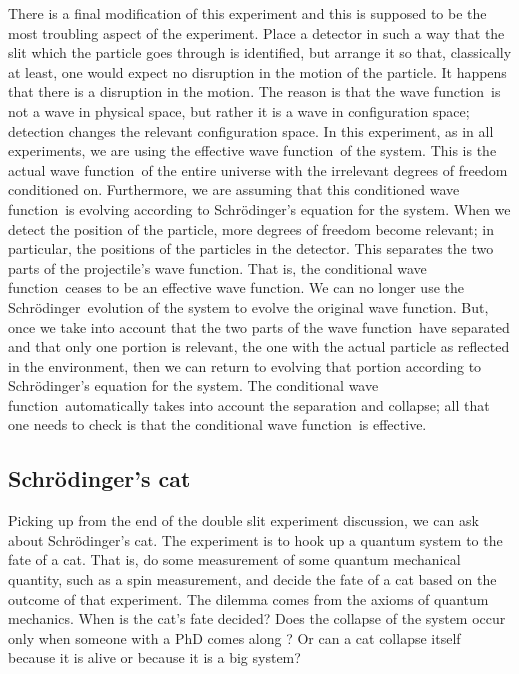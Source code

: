 \documentclass[11pt]{article}
\theoremstyle{remark}
\begin{document}
There is a
final modification of this experiment and this is supposed to be the
most troubling aspect of the experiment. 
Place a detector in such a way that the slit
which the particle goes through is identified, but arrange it so that,
classically at least, one would expect no disruption in the motion of
the particle. It happens that there is a disruption in the
motion. The reason is that the wave function\ is not  a wave in physical space,
but rather it is a wave in configuration space; detection changes the
relevant configuration space. 
In this experiment, as in all experiments, we are
using the effective wave function\ of the system. This is the actual wave function\ of the
entire universe with the irrelevant degrees of freedom conditioned
on. Furthermore, we are assuming that this conditioned wave function\ is
evolving according to Schr\"odinger's equation for the system. When we detect
the position of the particle,  more degrees of freedom become
relevant; in particular, the positions of the particles in the
detector. This separates the two parts of the projectile's wave function. That
is, the conditional wave function\ ceases to be an effective wave function. We can no
longer use the Schr\"odinger\ evolution of the system to evolve the original wave function. But,
once we take into account that the two parts of the wave function\ have
separated and that only one portion is relevant, the one with the
actual particle as reflected in the environment, 
then we can return to evolving that portion according to Schr\"odinger's
equation for the system. The conditional wave function\ automatically takes into
account the separation and collapse; all that one needs to check is
that the conditional wave function\ is effective. 


\subsection{Schr\"odinger's cat}

Picking up from the end of the double slit experiment discussion, we
can ask about Schr\"odinger's cat. The experiment is  to hook up a
quantum system to the fate of a cat. That is, do some measurement of
some quantum mechanical quantity, such as a spin measurement, and
decide the fate of a cat based on the outcome of that experiment. The
dilemma comes from the axioms of quantum mechanics. When is the cat's
fate decided? Does the collapse of the system occur only when someone
with a PhD comes along \cite{Bell87}? Or can a cat collapse itself because
it is alive or because it is a big system? 
\end{document}
